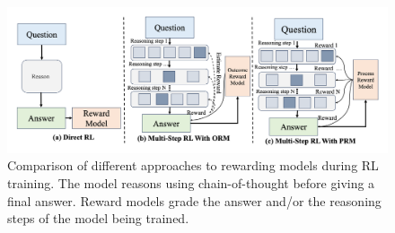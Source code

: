 \documentclass[aspectratio=169]{beamer}
\begin{document}
    \begin{frame}
        \begin{figure}
            \includegraphics[width=1\textwidth]{images/rl-reward-models}
            \caption{Comparison of different approaches to rewarding models during RL training. The model reasons using chain-of-thought before giving a final answer. Reward models grade the answer and/or the reasoning steps of the model being trained.~\parencite{xu2025largereasoningmodelssurvey}}
        \end{figure}
    \end{frame}
\end{document}

